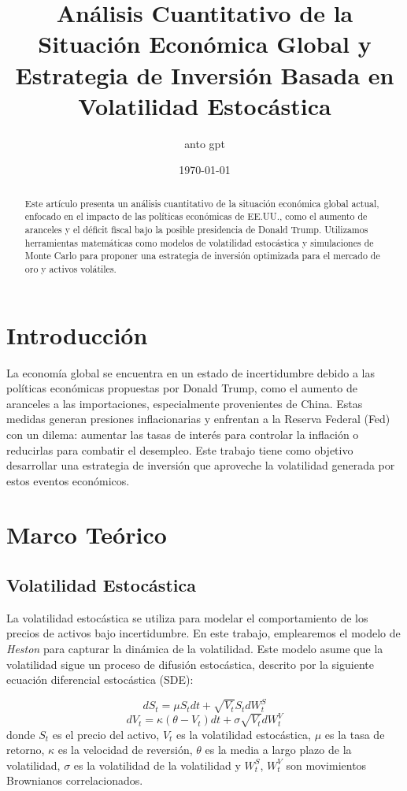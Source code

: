 \documentclass{article}
\title{Análisis Cuantitativo de la Situación Económica Global y Estrategia de Inversión Basada en Volatilidad Estocástica}
\author{anto gpt}
\date{\today}
\begin{document}
\maketitle

\begin{abstract}
Este artículo presenta un análisis cuantitativo de la situación económica global actual, enfocado en el impacto de las políticas económicas de EE.UU., como el aumento de aranceles y el déficit fiscal bajo la posible presidencia de Donald Trump. Utilizamos herramientas matemáticas como modelos de volatilidad estocástica y simulaciones de Monte Carlo para proponer una estrategia de inversión optimizada para el mercado de oro y activos volátiles. 
\end{abstract}

\section{Introducción}
La economía global se encuentra en un estado de incertidumbre debido a las políticas económicas propuestas por Donald Trump, como el aumento de aranceles a las importaciones, especialmente provenientes de China. Estas medidas generan presiones inflacionarias y enfrentan a la Reserva Federal (Fed) con un dilema: aumentar las tasas de interés para controlar la inflación o reducirlas para combatir el desempleo. Este trabajo tiene como objetivo desarrollar una estrategia de inversión que aproveche la volatilidad generada por estos eventos económicos.

\section{Marco Teórico}

\subsection{Volatilidad Estocástica}
La volatilidad estocástica se utiliza para modelar el comportamiento de los precios de activos bajo incertidumbre. En este trabajo, emplearemos el modelo de \textit{Heston} para capturar la dinámica de la volatilidad. Este modelo asume que la volatilidad sigue un proceso de difusión estocástica, descrito por la siguiente ecuación diferencial estocástica (SDE):

\[
dS_t = \mu S_t dt + \sqrt{V_t} S_t dW_t^S
\]
\[
dV_t = \kappa (\theta - V_t) dt + \sigma \sqrt{V_t} dW_t^V
\]
donde \(S_t\) es el precio del activo, \(V_t\) es la volatilidad estocástica, \(\mu\) es la tasa de retorno, \(\kappa\) es la velocidad de reversión, \(\theta\) es la media a largo plazo de la volatilidad, \(\sigma\) es la volatilidad de la volatilidad y \(W_t^S\), \(W_t^V\) son movimientos Brownianos correlacionados.
\end{document}

